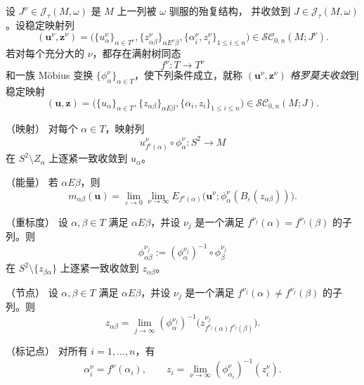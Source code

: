 \begin{definition}\label{def:5-5-1}
设 $J^\nu\in\mathcal J_\tau(M,\omega)$ 是 $M$ 上一列被 $\omega$ 驯服的殆复结构，
并收敛到 $J\in\mathcal J_\tau(M,\omega)$。设稳定映射列
\[
  (\mathbf u^\nu,\mathbf z^\nu)
  =\bigl(\{u_\alpha^\nu\}_{\alpha\in T^\nu},
    \{z_{\alpha\beta}^\nu\}_{\alpha E^\nu\beta},
    \{\alpha_i^\nu,z_i^\nu\}_{1\le i\le n}\bigr)
  \in\mathcal{SC}_{0,n}(M;J^\nu).
\]
若对每个充分大的 $\nu$，都存在满射树同态
\[
  f^\nu:T\longrightarrow T^\nu
\]
和一族 Möbius 变换 $\{\phi_\alpha^\nu\}_{\alpha\in T}$，使下列条件成立，就称
$(\mathbf u^\nu,\mathbf z^\nu)$ \emph{格罗莫夫收敛}到稳定映射
\[
  (\mathbf u,\mathbf z)
  =\bigl(\{u_\alpha\}_{\alpha\in T},
    \{z_{\alpha\beta}\}_{\alpha E\beta},
    \{\alpha_i,z_i\}_{1\le i\le n}\bigr)
  \in\mathcal{SC}_{0,n}(M;J).
\]

\medskip
\noindent\textup{（映射）}
对每个 $\alpha\in T$，映射列
\[
  u_{f^\nu(\alpha)}^\nu\circ\phi_\alpha^\nu:S^2\to M
\]
在 $S^2\setminus Z_\alpha$ 上逐紧一致收敛到 $u_\alpha$。

\medskip
\noindent\textup{（能量）}
若 $\alpha E\beta$，则
\begin{equation}\label{eq:5-5-1}
  m_{\alpha\beta}(\mathbf u)
  =\lim_{\varepsilon\to0}\lim_{\nu\to\infty}
  E_{f^\nu(\alpha)}
  \bigl(\mathbf u^\nu;
    \phi_\alpha^\nu(B_\varepsilon(z_{\alpha\beta}))\bigr).
\end{equation}

\medskip
\noindent\textup{（重标度）}
设 $\alpha,\beta\in T$ 满足 $\alpha E\beta$，并设 $\nu_j$ 是一个满足
$f^{\nu_j}(\alpha)=f^{\nu_j}(\beta)$ 的子列。则
\[
  \phi_{\alpha\beta}^{\nu_j}
  :=(\phi_\alpha^{\nu_j})^{-1}\circ\phi_\beta^{\nu_j}
\]
在 $S^2\setminus\{z_{\beta\alpha}\}$ 上逐紧一致收敛到 $z_{\alpha\beta}$。

\medskip
\noindent\textup{（节点）}
设 $\alpha,\beta\in T$ 满足 $\alpha E\beta$，并设 $\nu_j$ 是一个满足
$f^{\nu_j}(\alpha)\ne f^{\nu_j}(\beta)$ 的子列。则
\[
  z_{\alpha\beta}
  =\lim_{j\to\infty}
  (\phi_\alpha^{\nu_j})^{-1}
  \bigl(z_{f^{\nu_j}(\alpha)f^{\nu_j}(\beta)}^{\nu_j}\bigr).
\]

\medskip
\noindent\textup{（标记点）}
对所有 $i=1,\ldots,n$，有
\[
  \alpha_i^\nu=f^\nu(\alpha_i),
  \qquad
  z_i=\lim_{\nu\to\infty}
  (\phi_{\alpha_i}^\nu)^{-1}(z_i^\nu).
\]
\end{definition}

